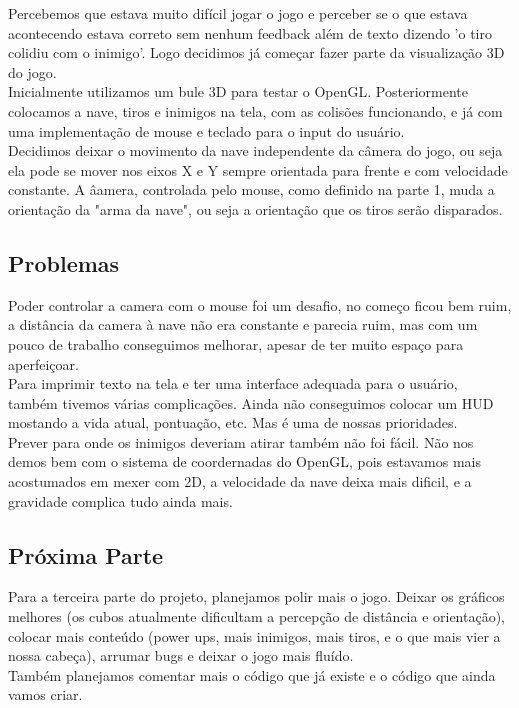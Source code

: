 \documentclass[12pt,a4paper]{article}
\begin{document}
    		Percebemos que estava muito difícil jogar o jogo e perceber se o que estava acontecendo estava
		correto sem nenhum feedback além de texto dizendo 'o tiro colidiu com o inimigo'. Logo decidimos já começar
		fazer parte da visualização 3D do jogo.\\
		
    		Inicialmente utilizamos um bule 3D para testar o OpenGL. Posteriormente colocamos a nave, tiros e inimigos
		na tela, com as colisões funcionando, e já com uma implementação de mouse e teclado para o input do usuário.\\
    		
    		Decidimos deixar o movimento da nave independente da câmera do jogo, ou seja ela pode se mover
		nos eixos X e Y sempre orientada para frente e com velocidade constante. A âamera, controlada pelo mouse,
		como definido na parte 1, muda a orientação da "arma da nave", ou seja a orientação que os tiros serão 				disparados.\\
		
		\subsection{Problemas}
		Poder controlar a camera com o mouse foi um desafio, no começo ficou bem ruim, a distância da camera à nave
		não era constante e parecia ruim, mas com um pouco de trabalho conseguimos melhorar, apesar de ter muito 				espaço para aperfeiçoar. \\
    		
    		Para imprimir texto na tela e ter uma interface adequada para o usuário, também tivemos várias complicações.
    		Ainda não conseguimos colocar um HUD mostando a vida atual, pontuação, etc. Mas é uma de nossas prioridades.\\
    		
    		Prever para onde os inimigos deveriam atirar também não foi fácil. Não nos demos bem com o sistema de 				coordernadas do OpenGL, pois estavamos mais acostumados em mexer com 2D, a velocidade da nave deixa mais 				dificil, e a gravidade complica tudo ainda mais.
		
		
		\subsection{Próxima Parte}
		Para a terceira parte do projeto, planejamos polir mais o jogo. Deixar os gráficos melhores (os cubos
		atualmente dificultam a percepção de distância e orientação), colocar mais conteúdo (power ups, mais 					inimigos, mais tiros, e o que mais vier a nossa cabeça), arrumar bugs e deixar o jogo mais fluído.\\
		
		Também planejamos comentar mais o código que já existe e o código que ainda vamos criar.		
\end{document}
